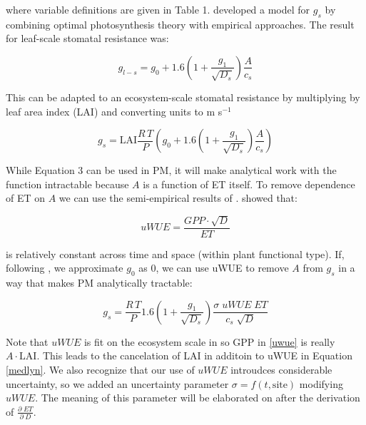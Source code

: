 \documentclass[draft,linenumbers]{agujournal}
\begin{document}
 where variable definitions are given in Table 1. \citet{MEDLYN_2011} developed a model for $g_s$ by combining optimal photosynthesis theory with empirical approaches. The result for leaf-scale stomatal resistance was:

\begin{linenomath*}
  \begin{equation}
  g_{l-s} = g_0 + 1.6 \left(1 + \frac{g_1}{\sqrt{D_{s}}}\right) \frac{A}{c_s}
  \end{equation}
\end{linenomath*}

This can be adapted to an ecosystem-scale stomatal resistance by multiplying by leaf area index (LAI) and converting units to m s$^{-1}$

\begin{linenomath*}
  \label{medlyn}
  \begin{equation}
  g_s = \text{LAI} \frac{R \,T}{P} \left( g_0 + 1.6 \left(1 + \frac{g_1}{\sqrt{D_{s}}}\right) \frac{A}{c_s}\right)
  \end{equation}
\end{linenomath*}

While Equation 3 can be used in PM, it will make analytical work with the function intractable because $A$ is a function of ET itself. To remove dependence of ET on $A$ we can use the semi-empirical results of \citet{Zhou_2015}. \citet{Zhou_2015} showed that:

\begin{linenomath*}
  \begin{equation}
    \label{uwue}
uWUE = \frac{GPP \cdot \sqrt{D}}{ET}
  \end{equation}
\end{linenomath*}
is relatively constant across time and space (within plant functional type). If, following \citet{Lin_2015}, we approximate $g_0$ as $0$, we can use uWUE to remove $A$ from $g_s$ in a way that makes PM analytically tractable:

\begin{linenomath*}
  \begin{equation}
  g_s = \frac{R \, T}{P} 1.6 \left(1 + \frac{g_1}{\sqrt{D_{s}}}\right) \frac{\sigma \; uWUE \; ET}{c_s \; \sqrt{D}}
  \end{equation}
\end{linenomath*}

Note that $uWUE$ is fit on the ecosystem scale in \citet{Zhou_2015} so GPP in \ref{uwue} is really $A\cdot \text{LAI}$. This leads to the cancelation of LAI in additoin to uWUE in Equation \ref{medlyn}. We also recognize that our use of $uWUE$ introudces considerable uncertainty, so we added an uncertainty parameter $\sigma = f(t, \text{site})$ modifying $uWUE$. The meaning of this parameter will be elaborated on after the derivation of $\frac{\partial \; ET}{\partial \; D}$.
\end{document}
